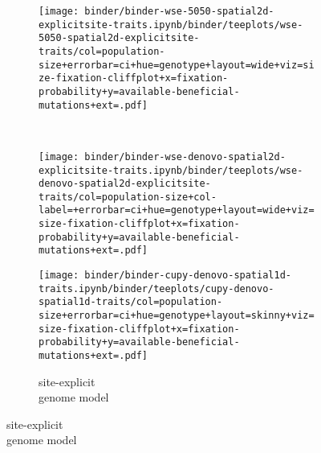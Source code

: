 \begin{figure}[h]
\begin{minipage}{\textwidth}
    \vspace{-10ex}

    \begin{subfigure}[b]{\linewidth}
        \begin{minipage}{0.41\textwidth}
          \texttt{[image: binder/binder-wse-5050-spatial2d-explicitsite-traits.ipynb/binder/teeplots/wse-5050-spatial2d-explicitsite-traits/col=population-size+errorbar=ci+hue=genotype+layout=wide+viz=size-fixation-cliffplot+x=fixation-probability+y=available-beneficial-mutations+ext=.pdf]}%
        \end{minipage}%
        \begin{minipage}{0.08\textwidth}
          ~
        \end{minipage}%
        \begin{minipage}{0.38\textwidth}
          \texttt{[image: binder/binder-wse-denovo-spatial2d-explicitsite-traits.ipynb/binder/teeplots/wse-denovo-spatial2d-explicitsite-traits/col=population-size+col-label=+errorbar=ci+hue=genotype+layout=wide+viz=size-fixation-cliffplot+x=fixation-probability+y=available-beneficial-mutations+ext=.pdf]}%
        \end{minipage}%
      \begin{minipage}{0.12\textwidth}
        \raggedright
        \large
        \vspace{10ex}
        \caption{site-explicit\\ genome model}
        \label{fig:denovo-5050-conditions:site-explicit}

        \texttt{[image: binder/binder-cupy-denovo-spatial1d-traits.ipynb/binder/teeplots/cupy-denovo-spatial1d-traits/col=population-size+errorbar=ci+hue=genotype+layout=skinny+viz=size-fixation-cliffplot+x=fixation-probability+y=available-beneficial-mutations+ext=.pdf]}%
      \end{minipage}%
    \end{subfigure}%

  \end{minipage}

  \vspace{-10ex}


\end{figure}
